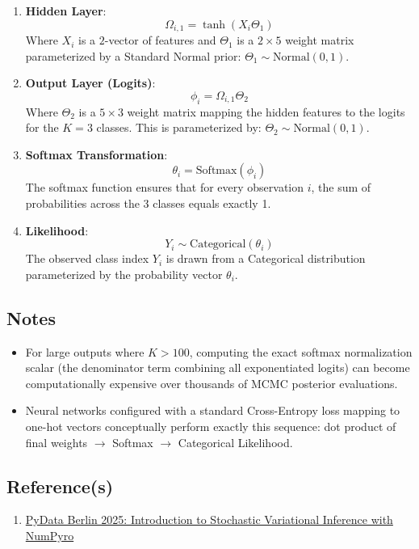 \documentclass[
  letterpaper,
  DIV=11,
  numbers=noendperiod]{scrartcl}
\providecommand{\tightlist}{%
  \setlength{\itemsep}{0pt}\setlength{\parskip}{0pt}}
\begin{document}
\begin{enumerate}
\def\labelenumi{\arabic{enumi}.}
\item
  \textbf{Hidden Layer}: \[
  \Omega_{i,1} = \tanh(X_i \Theta_1)
  \] Where \(X_i\) is a \(2\)-vector of features and \(\Theta_1\) is a
  \(2 \times 5\) weight matrix parameterized by a Standard Normal prior:
  \(\Theta_1 \sim \text{Normal}(0, 1)\).
\item
  \textbf{Output Layer (Logits)}: \[
  \phi_i = \Omega_{i,1} \Theta_2
  \] Where \(\Theta_2\) is a \(5 \times 3\) weight matrix mapping the
  hidden features to the logits for the \(K=3\) classes. This is
  parameterized by: \(\Theta_2 \sim \text{Normal}(0, 1)\).
\item
  \textbf{Softmax Transformation}: \[
  \theta_i = \text{Softmax}(\phi_i)
  \] The softmax function ensures that for every observation \(i\), the
  sum of probabilities across the 3 classes equals exactly 1.
\item
  \textbf{Likelihood}: \[
  Y_i \sim \text{Categorical}(\theta_i)
  \] The observed class index \(Y_i\) is drawn from a Categorical
  distribution parameterized by the probability vector \(\theta_i\).
\end{enumerate}

\subsection{Notes}\label{notes}

\begin{tcolorbox}[enhanced jigsaw, colback=white, breakable, left=2mm, arc=.35mm, colbacktitle=quarto-callout-note-color!10!white, colframe=quarto-callout-note-color-frame, leftrule=.75mm, opacityback=0, title=\textcolor{quarto-callout-note-color}{\faInfo}\hspace{0.5em}{Note}, titlerule=0mm, coltitle=black, rightrule=.15mm, toprule=.15mm, bottomtitle=1mm, toptitle=1mm, bottomrule=.15mm, opacitybacktitle=0.6]

\begin{itemize}
\tightlist
\item
  For large outputs where \(K > 100\), computing the exact softmax
  normalization scalar (the denominator term combining all exponentiated
  logits) can become computationally expensive over thousands of MCMC
  posterior evaluations.
\item
  Neural networks configured with a standard Cross-Entropy loss mapping
  to one-hot vectors conceptually perform exactly this sequence: dot
  product of final weights \(\rightarrow\) Softmax \(\rightarrow\)
  Categorical Likelihood.
\end{itemize}

\end{tcolorbox}

\subsection{Reference(s)}\label{references}

\begin{enumerate}
\def\labelenumi{\arabic{enumi}.}
\tightlist
\item
  \href{https://juanitorduz.github.io/intro_svi/}{PyData Berlin 2025:
  Introduction to Stochastic Variational Inference with NumPyro}
\end{enumerate}
\end{document}
